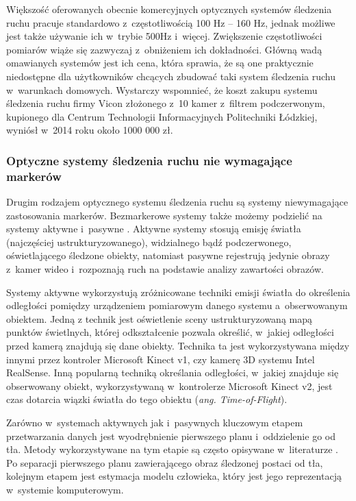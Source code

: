 Większość oferowanych obecnie komercyjnych optycznych systemów śledzenia ruchu pracuje standardowo z~częstotliwością 100 Hz -- 160 Hz, jednak możliwe jest także używanie ich w~trybie 500Hz i~więcej. Zwiększenie częstotliwości pomiarów wiąże się zazwyczaj z~obniżeniem ich dokładności.
Główną wadą omawianych systemów jest ich cena, która sprawia, że są one praktycznie niedostępne dla użytkowników chcących zbudować taki system śledzenia ruchu w~warunkach domowych. Wystarczy wspomnieć, że koszt zakupu systemu śledzenia ruchu firmy Vicon złożonego z~10 kamer z~filtrem podczerwonym, kupionego dla Centrum Technologii Informacyjnych Politechniki Łódzkiej,  wyniósł w~2014 roku około 1000 000 zł.
			 
\subsubsection*{Optyczne systemy śledzenia ruchu nie wymagające markerów}\label{chap:mocaps:Kinect}
Drugim rodzajem optycznego systemu śledzenia ruchu są systemy niewymagające zastosowania markerów. Bezmarkerowe systemy także możemy podzielić na systemy aktywne i~pasywne \cite{Mundermann2006}. Aktywne systemy stosują emisję światła (najczęściej ustrukturyzowanego), widzialnego bądź podczerwonego, oświetlającego śledzone obiekty, natomiast pasywne rejestrują jedynie obrazy z~kamer wideo i~rozpoznają ruch na podstawie analizy zawartości obrazów. 

Systemy aktywne wykorzystują zróżnicowane techniki emisji światła do określenia odległości pomiędzy urządzeniem pomiarowym danego systemu a~obserwowanym obiektem. Jedną z technik jest oświetlenie sceny ustrukturyzowaną mapą punktów świetlnych, której odkształcenie pozwala określić, w~jakiej odległości przed kamerą znajdują się dane obiekty. Technika ta jest wykorzystywana między innymi przez kontroler Microsoft Kinect v1, czy kamerę 3D systemu Intel RealSense. Inną popularną techniką określania odległości, w~jakiej znajduje się obserwowany obiekt, wykorzystywaną w~kontrolerze Microsoft Kinect v2, jest czas dotarcia wiązki światła do tego obiektu (\emph{ang. Time-of-Flight})\cite{Hansard2013}.
			
Zarówno w~systemach aktywnych jak i~pasywnych kluczowym etapem przetwarzania danych jest wyodrębnienie pierwszego planu i~oddzielenie go od tła. Metody wykorzystywane na tym etapie są często opisywane w~literaturze \cite{wang2003recent, rosenhahn2008markerless, guan2009estimating, surer2011markerless, corazza2006markerless}. Po separacji pierwszego planu zawierającego obraz śledzonej postaci od tła, kolejnym etapem jest estymacja modelu człowieka, który jest jego reprezentacją w~systemie komputerowym. 
			
